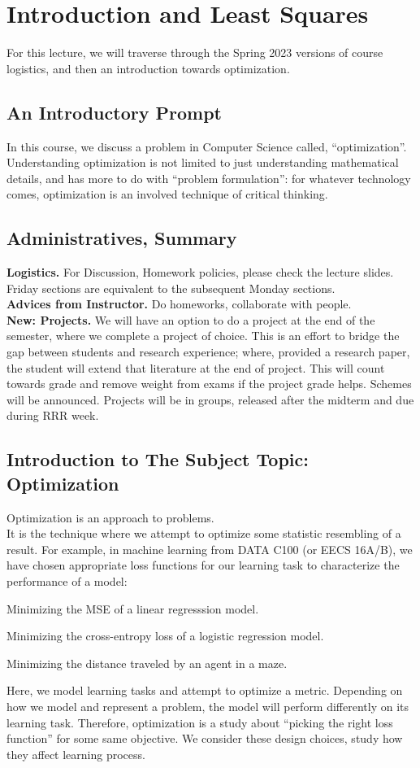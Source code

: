 \chapter{Introduction and Least Squares}
For this lecture, we will traverse through the Spring 2023 versions of course logistics, and then an introduction towards optimization.

\section{An Introductory Prompt}
In this course, we discuss a problem in Computer Science called, ``optimization''.
Understanding optimization is not limited to just understanding mathematical details, and has more to do with ``problem formulation'': for whatever technology comes, optimization is an involved technique of critical thinking.

\section{Administratives, Summary}
\textbf{Logistics.} For Discussion, Homework policies, please check the lecture slides. Friday sections are equivalent to the subsequent Monday sections. \\
\textbf{Advices from Instructor.} Do homeworks, collaborate with people. \\
\textbf{New: Projects.} We will have an option to do a project at the end of the semester, where we complete a project of choice.
This is an effort to bridge the gap between students and research experience; where, provided a research paper, the student will extend that literature at the end of project.
This will count towards grade and remove weight from exams if the project grade helps.
Schemes will be announced. Projects will be in groups, released after the midterm and due during RRR week.

\section{Introduction to The Subject Topic: Optimization}
Optimization is an approach to problems. \\
It is the technique where we attempt to optimize some statistic resembling of a result.
For example, in machine learning from DATA C100 (or EECS 16A/B), we have chosen appropriate loss functions for our learning task to characterize the performance of a model:
\begin{bindenum}
    \item Minimizing the MSE of a linear regresssion model.
    \item Minimizing the cross-entropy loss of a logistic regression model.
    \item Minimizing the distance traveled by an agent in a maze.
\end{bindenum}
Here, we model learning tasks and attempt to optimize a metric. Depending on how we model and represent a problem, the model will perform differently on its learning task.
Therefore, optimization is a study about ``picking the right loss function'' for some same objective.
We consider these design choices, study how they affect learning process.

